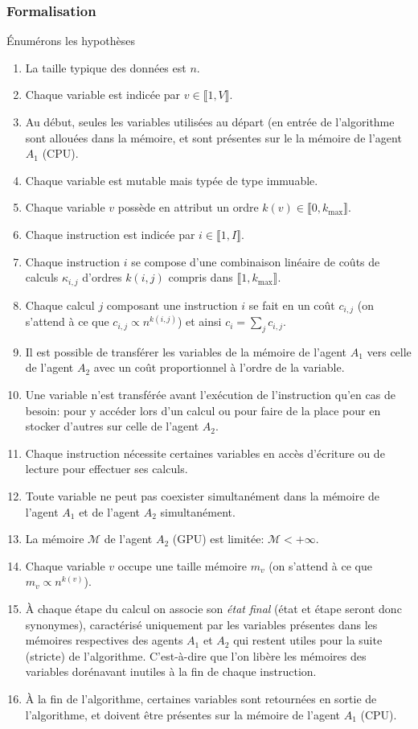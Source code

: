 \documentclass[svgnames,dvipsnames,a4paper,10pt,french]{report}
\begin{document}
\begin{appendices}
\subsubsection{Formalisation}
Énumérons les hypothèses
\begin{enumerate}
    \item La taille typique des données est $n$.
    \item Chaque variable est indicée par $v\in \llbracket 1, V \rrbracket$.
    \item Au début, seules les variables utilisées au départ (en entrée de l'algorithme sont allouées dans la mémoire, et sont présentes sur le la mémoire de l'agent $A_1$ (CPU).
    \item Chaque variable est mutable mais typée de type immuable.
    \item Chaque variable $v$ possède en attribut un ordre $k(v) \in \llbracket 0, k_{\text{max}} \rrbracket$.
    \item Chaque instruction est indicée par $i\in \llbracket 1, I \rrbracket$.
    \item Chaque instruction $i$ se compose d'une combinaison linéaire de coûts de  calculs $\kappa_{i,j}$ d'ordres $k(i,j)$ compris dans $\llbracket 1, k_{\text{max}} \rrbracket$.
    \item Chaque calcul $j$ composant une instruction $i$ se fait en un coût $c_{i,j}$ (on s'attend à ce que $c_{i,j} \propto n^{k(i,j)}$) et ainsi $c_i = \sum_j c_{i,j}$.
    \item Il est possible de transférer les variables de la mémoire de l'agent $A_1$ vers celle de l'agent $A_2$ avec un coût proportionnel à l'ordre de la variable.
    \item Une variable n'est transférée avant l'exécution de l'instruction qu'en cas de besoin: pour y accéder lors d'un calcul ou pour faire de la place pour en stocker d'autres sur celle de l'agent $A_2$.
    \item Chaque instruction nécessite certaines variables en accès d'écriture ou de lecture pour effectuer ses calculs.
    \item Toute variable ne peut pas coexister simultanément dans la mémoire de l'agent $A_1$ et de l'agent $A_2$ simultanément.
    \item La mémoire $\mathcal{M}$ de l'agent $A_2$ (GPU) est limitée: $\mathcal{M} < + \infty$.
    \item Chaque variable $v$ occupe une taille mémoire $m_v$ (on s'attend à ce que $m_v \propto n^{k(v)}$).
    \item À chaque étape du calcul on associe son \textit{état final} (état et étape seront donc synonymes), caractérisé uniquement par les variables présentes dans les mémoires respectives des agents $A_1$ et $A_2$ qui restent utiles pour la suite (stricte) de l'algorithme. C'est-à-dire que l'on libère les mémoires des variables dorénavant inutiles à la fin de chaque instruction.
    \item À la fin de l'algorithme, certaines variables sont retournées en sortie de l'algorithme, et doivent être présentes sur la mémoire de l'agent $A_1$ (CPU).
\end{enumerate}


\end{appendices}
\end{document}

